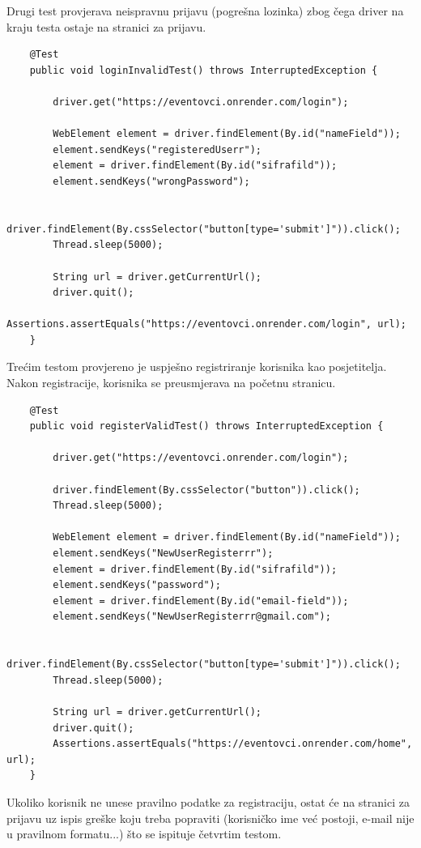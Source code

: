 			Drugi test provjerava neispravnu prijavu (pogrešna lozinka) zbog čega driver na kraju testa ostaje na stranici za prijavu.
			
\begin{lstlisting}
	@Test
	public void loginInvalidTest() throws InterruptedException {
		
		driver.get("https://eventovci.onrender.com/login");
		
		WebElement element = driver.findElement(By.id("nameField"));
		element.sendKeys("registeredUserr");
		element = driver.findElement(By.id("sifrafild"));
		element.sendKeys("wrongPassword");
		
		driver.findElement(By.cssSelector("button[type='submit']")).click();
		Thread.sleep(5000);
		
		String url = driver.getCurrentUrl();
		driver.quit();
		Assertions.assertEquals("https://eventovci.onrender.com/login", url);
	}
\end{lstlisting}

			Trećim testom provjereno je uspješno registriranje korisnika kao posjetitelja. Nakon registracije, korisnika se preusmjerava na početnu stranicu.
			
\begin{lstlisting}
	@Test
	public void registerValidTest() throws InterruptedException {
		
		driver.get("https://eventovci.onrender.com/login");
		
		driver.findElement(By.cssSelector("button")).click();
		Thread.sleep(5000);
		
		WebElement element = driver.findElement(By.id("nameField"));
		element.sendKeys("NewUserRegisterrr");
		element = driver.findElement(By.id("sifrafild"));
		element.sendKeys("password");
		element = driver.findElement(By.id("email-field"));
		element.sendKeys("NewUserRegisterrr@gmail.com");
		
		driver.findElement(By.cssSelector("button[type='submit']")).click();
		Thread.sleep(5000);
		
		String url = driver.getCurrentUrl();
		driver.quit();
		Assertions.assertEquals("https://eventovci.onrender.com/home", url);
	}
\end{lstlisting}

			Ukoliko korisnik ne unese pravilno podatke za registraciju, ostat će na stranici za prijavu uz ispis greške koju treba popraviti (korisničko ime već postoji, e-mail nije u pravilnom formatu...) što se ispituje četvrtim testom.
			
